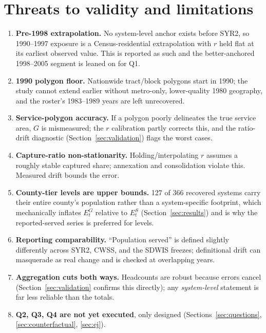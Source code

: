 \documentclass[11pt]{article}
\begin{document}
\section{Threats to validity and limitations}
\label{sec:threats}

\begin{enumerate}[leftmargin=2em]
  \item \textbf{Pre-1998 extrapolation.} No system-level anchor exists before
    SYR2, so 1990--1997 exposure is a Census-residential extrapolation with
    $r$ held flat at its earliest observed value. This is reported as such
    and the better-anchored 1998--2005 segment is leaned on for Q1.
  \item \textbf{1990 polygon floor.} Nationwide tract/block polygons start in
    1990; the study cannot extend earlier without metro-only, lower-quality
    1980 geography, and the roster's 1983--1989 years are left unrecovered.
  \item \textbf{Service-polygon accuracy.} If a polygon poorly delineates the
    true service area, $G$ is mismeasured; the $r$ calibration partly
    corrects this, and the ratio-drift diagnostic (Section~\ref{sec:validation})
    flags the worst cases.
  \item \textbf{Capture-ratio non-stationarity.} Holding/interpolating $r$
    assumes a roughly stable captured share; annexation and consolidation
    violate this. Measured drift bounds the error.
  \item \textbf{County-tier levels are upper bounds.} 127 of 366 recovered
    systems carry their entire county's population rather than a
    system-specific footprint, which mechanically inflates $E^G_t$ relative
    to $E^S_t$ (Section~\ref{sec:results}) and is why the reported-served
    series is preferred for levels.
  \item \textbf{Reporting comparability.} ``Population served'' is defined
    slightly differently across SYR2, CWSS, and the SDWIS freezes;
    definitional drift can masquerade as real change and is checked at
    overlapping years.
  \item \textbf{Aggregation cuts both ways.} Headcounts are robust because
    errors cancel (Section~\ref{sec:validation} confirms this directly); any
    \emph{system-level} statement is far less reliable than the totals.
  \item \textbf{Q2, Q3, Q4 are not yet executed}, only designed
    (Sections~\ref{sec:questions}, \ref{sec:counterfactual}, \ref{sec:ej}).
\end{enumerate}
\end{document}
